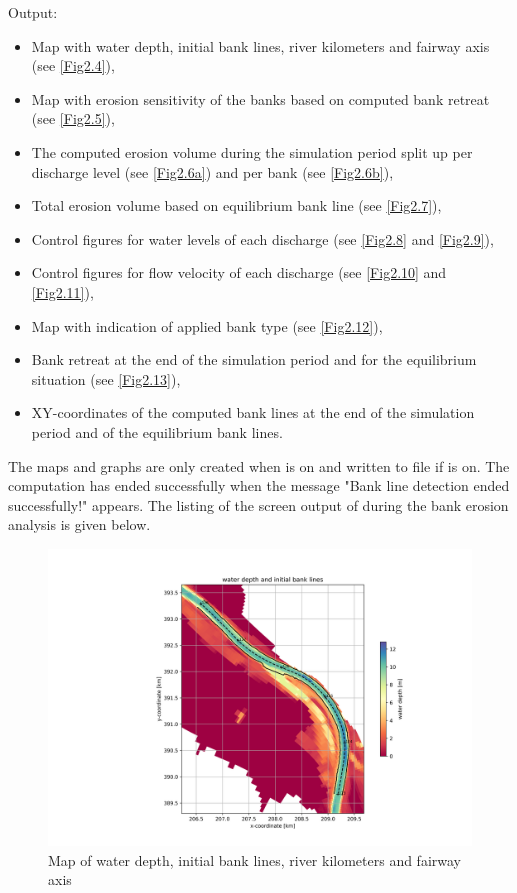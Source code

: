 Output:

\begin{itemize}
\item Map with water depth, initial bank lines, river kilometers and fairway axis (see \autoref{Fig2.4}),
\item Map with erosion sensitivity of the banks based on computed bank retreat (see \autoref{Fig2.5}),
\item The computed erosion volume during the simulation period split up per discharge level (see \autoref{Fig2.6a}) and per bank (see \autoref{Fig2.6b}),
\item Total erosion volume based on equilibrium bank line (see \autoref{Fig2.7}),
\item Control figures for water levels of each discharge (see \autoref{Fig2.8} and \autoref{Fig2.9}),
\item Control figures for flow velocity of each discharge (see \autoref{Fig2.10} and \autoref{Fig2.11}),
\item Map with indication of applied bank type (see \autoref{Fig2.12}),
\item Bank retreat at the end of the simulation period and for the equilibrium situation (see \autoref{Fig2.13}),
\item XY-coordinates of the computed bank lines at the end of the simulation period and of the equilibrium bank lines.
\end{itemize}

The maps and graphs are only created when  is on and written to file if  is on.
The computation has ended successfully when the message "Bank line detection ended successfully!" appears.
The listing of the screen output of \dfastbe during the bank erosion analysis is given below.

\begin{figure}
\includegraphics[width=\textwidth]{figures/1_banklines.png}
\caption{Map of water depth, initial bank lines, river kilometers and fairway axis}
\label{Fig2.4}
\end{figure}

